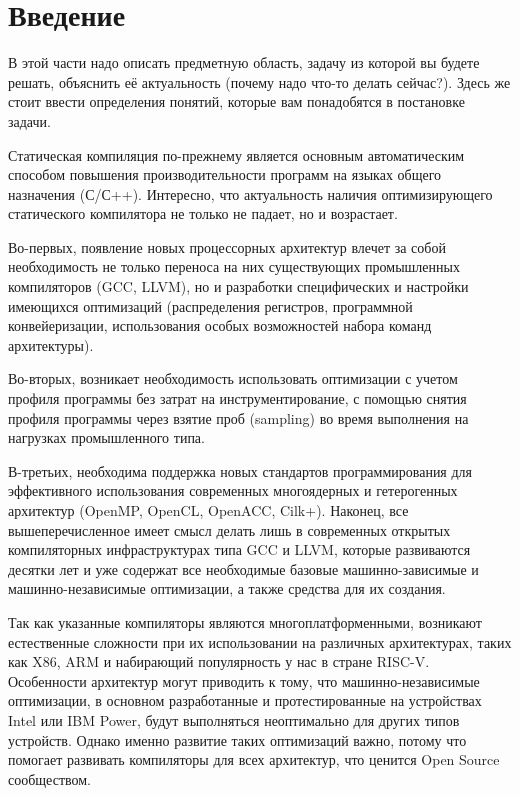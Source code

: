 \chapter{Введение}
\label{sec:Chapter0} 

В этой части надо описать предметную область, задачу из которой вы будете решать, объяснить её актуальность (почему надо что-то делать сейчас?).
Здесь же стоит ввести определения понятий, которые вам понадобятся в постановке задачи.


Статическая компиляция по-прежнему является основным автоматическим
способом повышения производительности программ на языках общего
назначения (С/С++). Интересно, что актуальность наличия
оптимизирующего статического компилятора не только не падает, но и
возрастает. 

Во-первых, появление новых процессорных архитектур влечет за
собой необходимость не только переноса на них существующих
промышленных компиляторов (GCC, LLVM), но
и разработки специфических
и настройки имеющихся оптимизаций (распределения регистров,
программной конвейеризации, использования особых возможностей набора
команд архитектуры). 

Во-вторых,
возникает необходимость использовать оптимизации с учетом профиля
программы без затрат на инструментирование, с помощью снятия профиля
программы через взятие проб (sampling) во время выполнения на нагрузках
промышленного типа. 

В-третьих, необходима поддержка новых стандартов
программирования для эффективного использования современных многоядерных
и гетерогенных архитектур (OpenMP, OpenCL, OpenACC,
Cilk+). Наконец, все вышеперечисленное имеет смысл делать лишь в
современных открытых компиляторных инфраструктурах типа GCC
и LLVM,
которые развиваются десятки лет
и уже содержат все необходимые базовые
машинно-зависимые
и машинно-независимые оптимизации, а также средства
для их создания. 

Так как указанные компиляторы являются многоплатформенными, возникают
естественные сложности при их использовании на различных архитектурах, таких как X86, ARM и набирающий популярность у нас в стране RISC-V. Особенности архитектур могут приводить
к тому, что машинно-независимые оптимизации,
в основном разработанные
и протестированные на устройствах Intel или IBM Power, будут выполняться неоптимально для других типов устройств. Однако именно развитие таких оптимизаций важно, потому что помогает развивать компиляторы для всех архитектур, что ценится Open Source сообществом.   

